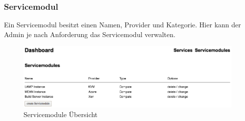\subsubsection{Servicemodul}
Ein Servicemodul besitzt einen Namen, Provider und Kategorie.
Hier kann der Admin je nach Anforderung das Servicemodul verwalten.
\newline
\begin{figure}[!htbp]
\includegraphics[width=\textwidth]{./04_Anforderungen/images/servicemodules_admin}
\caption{Servicemodule Übersicht}
\end{figure}
